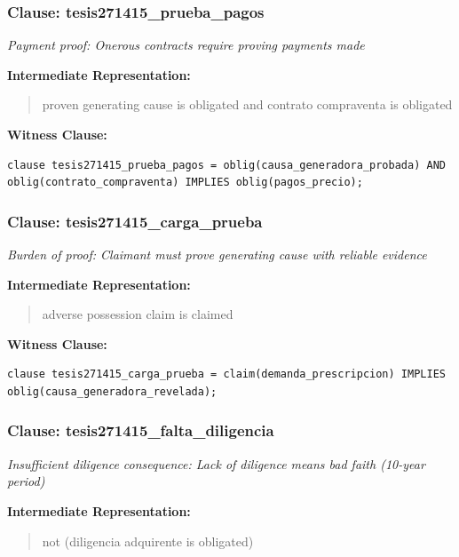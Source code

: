 \documentclass[11pt,a4paper]{article}
\begin{document}
\subsubsection{Clause: tesis271415\_prueba\_pagos}

\textit{Payment proof: Onerous contracts require proving payments made}

\textbf{Intermediate Representation:}

\begin{quote}
proven generating cause is obligated and contrato compraventa is obligated
\end{quote}

\textbf{Witness Clause:}

\begin{lstlisting}[style=witnessstyle, language=Witness]
clause tesis271415_prueba_pagos = oblig(causa_generadora_probada) AND oblig(contrato_compraventa) IMPLIES oblig(pagos_precio);
\end{lstlisting}

\subsubsection{Clause: tesis271415\_carga\_prueba}

\textit{Burden of proof: Claimant must prove generating cause with reliable evidence}

\textbf{Intermediate Representation:}

\begin{quote}
adverse possession claim is claimed
\end{quote}

\textbf{Witness Clause:}

\begin{lstlisting}[style=witnessstyle, language=Witness]
clause tesis271415_carga_prueba = claim(demanda_prescripcion) IMPLIES oblig(causa_generadora_revelada);
\end{lstlisting}

\subsubsection{Clause: tesis271415\_falta\_diligencia}

\textit{Insufficient diligence consequence: Lack of diligence means bad faith (10-year period)}

\textbf{Intermediate Representation:}

\begin{quote}
not (diligencia adquirente is obligated)
\end{quote}
\end{document}
